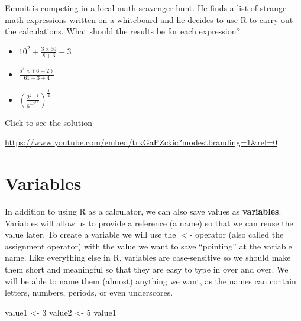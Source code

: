 \documentclass[
  letterpaper,
  DIV=11,
  numbers=noendperiod]{scrreprt}
\newenvironment{Shaded}{\begin{snugshade}}{\end{snugshade}}
\newcommand{\DecValTok}[1]{\textcolor[rgb]{0.68,0.00,0.00}{#1}}
\newcommand{\NormalTok}[1]{\textcolor[rgb]{0.00,0.23,0.31}{#1}}
\newcommand{\OtherTok}[1]{\textcolor[rgb]{0.00,0.23,0.31}{#1}}
\providecommand{\tightlist}{%
  \setlength{\itemsep}{0pt}\setlength{\parskip}{0pt}}
\begin{document}
\begin{tcolorbox}[enhanced jigsaw, colframe=quarto-callout-tip-color-frame, colback=white, breakable, rightrule=.15mm, title=\textcolor{quarto-callout-tip-color}{\faLightbulb}\hspace{0.5em}{Try it Out}, bottomtitle=1mm, toptitle=1mm, titlerule=0mm, left=2mm, coltitle=black, colbacktitle=quarto-callout-tip-color!10!white, leftrule=.75mm, opacitybacktitle=0.6, bottomrule=.15mm, opacityback=0, arc=.35mm, toprule=.15mm]

Emmit is competing in a local math scavenger hunt. He finds a list of
strange math expressions written on a whiteboard and he decides to use R
to carry out the calculations. What should the results be for each
expression?

\begin{itemize}
\tightlist
\item
  \(\displaystyle 10^2 + \frac{3\times 60}{8 + 3} - 3\)
\item
  \(\displaystyle \frac{5^3\times(6-2)}{61-3+4}\)
\item
  \(\displaystyle \left(\frac{2^{2+1}}{6^{-2^{2.5}}}\right)^\frac{1}{2}\)
\end{itemize}

Click to see the solution

\url{https://www.youtube.com/embed/trkGaPZckic?modestbranding=1&rel=0}

\end{tcolorbox}

\section{Variables}\label{variables}

In addition to using R as a calculator, we can also save values as
\textbf{variables}. Variables will allow us to provide a reference (a
name) so that we can reuse the value later. To create a variable we will
use the \(<\)- operator (also called the assignment operator) with the
value we want to save ``pointing'' at the variable name. Like everything
else in R, variables are case-sensitive so we should make them short and
meaningful so that they are easy to type in over and over. We will be
able to name them (almost) anything we want, as the names can contain
letters, numbers, periods, or even underscores.

\begin{Shaded}
\begin{Highlighting}[]
\NormalTok{value1 }\OtherTok{\textless{}{-}} \DecValTok{3}
\NormalTok{value2 }\OtherTok{\textless{}{-}} \DecValTok{5}
\NormalTok{value1}
\end{Highlighting}
\end{Shaded}
\end{document}
